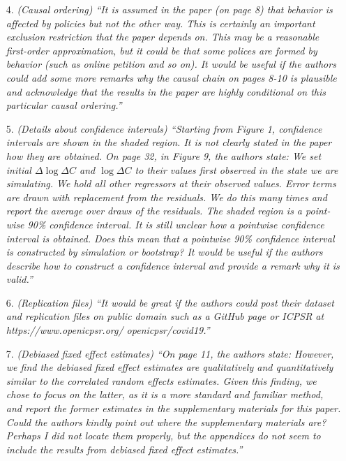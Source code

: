 \documentclass[11pt]{article}
\begin{document}
\begin{itemize}
  
  
  
  
\item[4.]  \textit{(Causal ordering) ``It is assumed in the paper (on page 8) that behavior is affected by policies
but not the other way. This is certainly an important exclusion restriction that the paper
depends on. This may be a reasonable first-order approximation, but it could be that some
polices are formed by behavior (such as online petition and so on). It would be useful if
the authors could add some more remarks why the causal chain on pages 8-10 is plausible
and acknowledge that the results in the paper are highly conditional on this particular causal
ordering.''}
  
\item[5.]  \textit{(Details about confidence intervals) ``Starting from Figure 1, confidence intervals are shown
in the shaded region. It is not clearly stated in the paper how they are obtained. On page 32,
in Figure 9, the authors state:
We set initial $\Delta\log\Delta C$ and $\log\Delta C$  to their values first observed in the state we
are simulating. We hold all other regressors at their observed values. Error terms
are drawn with replacement from the residuals. We do this many times and report
the average over draws of the residuals. The shaded region is a point-wise 90\%
confidence interval. It is still unclear how a pointwise confidence interval is obtained. Does this mean that a pointwise
90\% confidence interval is constructed by simulation or bootstrap? It would be useful if the authors describe how to construct a confidence interval and provide a remark why it is valid.''}
  
\item[6.]  \textit{(Replication files) ``It would be great if the authors could post their dataset and replication
files on public domain such as a GitHub page or ICPSR at https://www.openicpsr.org/
openicpsr/covid19.''}
  
\item[7.]  \textit{(Debiased fixed effect estimates) ``On page 11, the authors state:
However, we find the debiased fixed effect estimates are qualitatively and quantitatively
similar to the correlated random effects estimates. Given this finding,
we chose to focus on the latter, as it is a more standard and familiar method, and
report the former estimates in the supplementary materials for this paper.
Could the authors kindly point out where the supplementary materials are? Perhaps I did not
locate them properly, but the appendices do not seem to include the results from debiased
fixed effect estimates.''}
  

\end{itemize}
\end{document}
